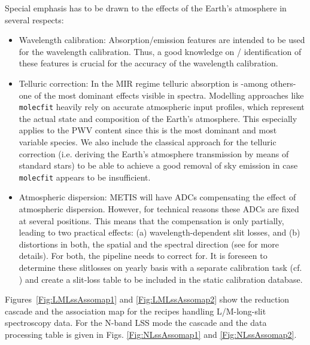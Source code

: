 Special emphasis has to be drawn to the effects of the Earth's atmosphere in several respects:
\begin{itemize}
\item Wavelength calibration: Absorption/emission features are intended to be
  used for the wavelength calibration. Thus, a good knowledge on /
  identification of these features is crucial for the accuracy of the
  wavelength calibration.
\item Telluric correction: In the MIR regime telluric absorption is -among others- one of the most dominant effects visible in    
 spectra. Modelling approaches like \texttt{molecfit} heavily rely on accurate atmospheric input profiles, which represent the actual state and composition of the Earth's atmosphere. This especially applies to the \ac{PWV} content since this is the most dominant and most variable species. We also include the classical approach for the telluric correction (i.e. deriving the Earth's atmosphere transmission by means of standard stars) to be able to achieve a good removal of sky emission in case \texttt{molecfit} appears to be insufficient.
\item Atmospheric dispersion: \ac{METIS} will have \ac{ADC}s compensating the effect of atmospheric dispersion. However, for technical reasons these ADCs are fixed at several positions. This means that the     compensation is only partially, leading to two practical effects:
  (a) wavelength-dependent slit losses, and (b) distortions in both,
  the spatial and the spectral direction (see \cite{METIS-ADC_study}
  for more details). For both, the pipeline needs to correct
  for. It is foreseen to determine these slitlosses on yearly basis with a separate calibration task (cf. \cite{METIS-calibration_plan}) and create a slit-loss table to be included in the static calibration database.
\end{itemize}


Figures~\ref{Fig:LMLssAssomap1} and \ref{Fig:LMLssAssomap2} show the reduction cascade and the association map for the recipes handling L/M-long-slit
spectroscopy data.  %
For the N-band \ac{LSS} mode the cascade and the data processing table is given in Figs. \ref{Fig:NLssAssomap1} and \ref{Fig:NLssAssomap2}.%

